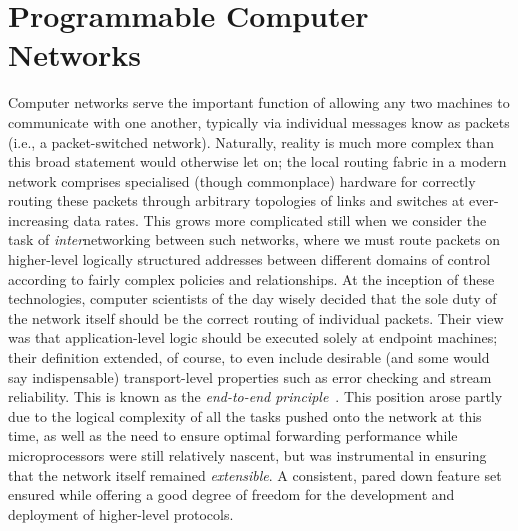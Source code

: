 \chapter{Programmable Computer Networks}\label{sec:ch-networks}\label{chap:nets}
Computer networks serve the important function of allowing any two machines to communicate with one another, typically via individual messages know as packets (i.e., a packet-switched network).
Naturally, reality is much more complex than this broad statement would otherwise let on; the local routing fabric in a modern network comprises specialised (though commonplace) hardware for correctly routing these packets through arbitrary topologies of links and switches at ever-increasing data rates.
This grows more complicated still when we consider the task of \emph{inter}networking between such networks, where we must route packets on higher-level logically structured addresses between different domains of control according to fairly complex policies and relationships.
At the inception of these technologies, computer scientists of the day wisely decided that the sole duty of the network itself should be the correct routing of individual packets.
Their view was that application-level logic should be executed solely at endpoint machines; their definition extended, of course, to even include desirable (and some would say indispensable) transport-level properties such as error checking and stream reliability.
This is known as the \emph{end-to-end principle}~\parencite{DBLP:journals/tocs/SaltzerRC84}.
This position arose partly due to the logical complexity of all the tasks pushed onto the network at this time, as well as the need to ensure optimal forwarding performance while microprocessors were still relatively nascent, but was instrumental in ensuring that the network itself remained \emph{extensible}.
A consistent, pared down feature set ensured while offering a good degree of freedom for the development and deployment of higher-level protocols.

